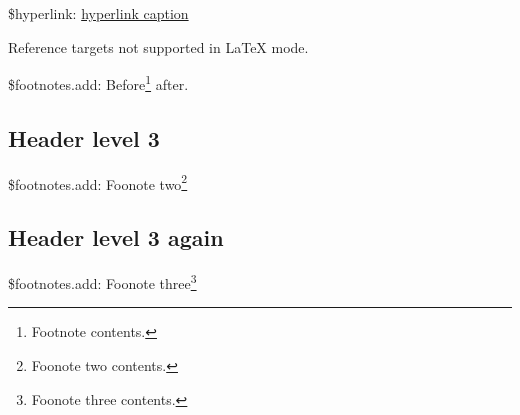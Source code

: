 \documentclass[demo]{pyscribe}
\begin{document}
\par\$hyperlink: \href{https://example.org}{hyperlink caption}

Reference targets not supported in LaTeX mode.

\par\$footnotes.add: Before\footnote{Footnote contents.} after.

\subsection{Header level 3}
\par\$footnotes.add: Foonote two\footnote{Foonote two contents.}

\subsection{Header level 3 again}
\par\$footnotes.add: Foonote three\footnote{Foonote three contents.}
\end{document}
